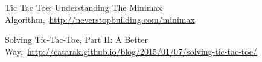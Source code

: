 \cleardoublepage
{}
{}
\begin{thebibliography}{99}

Tic Tac Toe: Understanding The Minimax Algorithm,\ \url{http://neverstopbuilding.com/minimax}

Solving Tic-Tac-Toe, Part II: A Better Way,\ \url{http://catarak.github.io/blog/2015/01/07/solving-tic-tac-toe/}

\end{thebibliography}
